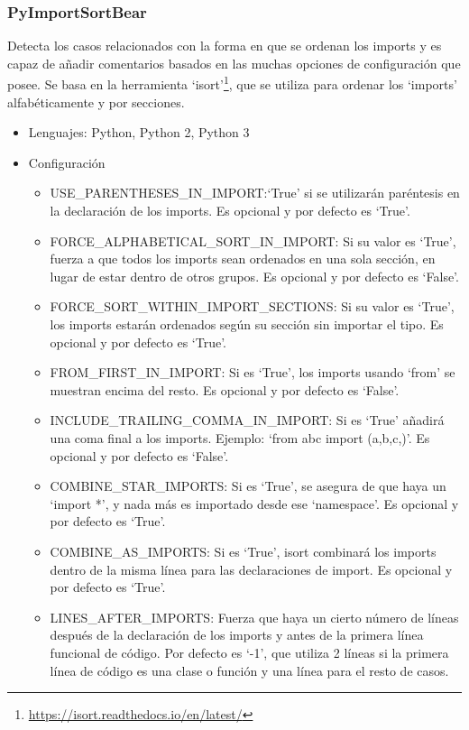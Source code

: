 \documentclass[a4paper, 12pt]{book}
\begin{document}
\subsubsection{PyImportSortBear}
\label{sec:seccion1.2.9}
Detecta los casos relacionados con la forma en que se ordenan los imports y es capaz de añadir comentarios basados en las muchas opciones de configuración que posee. Se basa en la herramienta `isort'\footnote{\url{https://isort.readthedocs.io/en/latest/}}, que se utiliza para ordenar los `imports' alfabéticamente y por secciones.

\begin{itemize}
  \item Lenguajes: Python, Python 2, Python 3
  \item Configuración
    \begin{itemize}
          \item USE\_PARENTHESES\_IN\_IMPORT:`True' si se utilizarán paréntesis en la declaración de los imports. Es opcional y por defecto es `True'.
          \item FORCE\_ALPHABETICAL\_SORT\_IN\_IMPORT: Si su valor es `True', fuerza a que todos los imports sean ordenados en una sola sección, en lugar de estar dentro de otros grupos. Es opcional y por defecto es `False'.
          \item FORCE\_SORT\_WITHIN\_IMPORT\_SECTIONS: Si su valor es `True', los imports estarán ordenados según su sección sin importar el tipo. Es opcional y por defecto es `True'.
          \item FROM\_FIRST\_IN\_IMPORT: Si es `True', los imports usando `from' se muestran encima del resto. Es opcional y por defecto es `False'.
          \item INCLUDE\_TRAILING\_COMMA\_IN\_IMPORT: Si es `True' añadirá una coma final a los imports. Ejemplo: `from abc import (a,b,c,)'. Es opcional y por defecto es `False'.
          \item COMBINE\_STAR\_IMPORTS: Si es `True', se asegura de que haya un `import *', y nada más es importado desde ese `namespace'. Es opcional y por defecto es `True'.
          \item COMBINE\_AS\_IMPORTS: Si es `True', isort combinará los imports dentro de la misma línea para las declaraciones de import. Es opcional y por defecto  es `True'.
          \item LINES\_AFTER\_IMPORTS: Fuerza que haya un cierto número de líneas después de la declaración de los imports y antes de la primera línea funcional de código. Por defecto es `-1', que utiliza 2 líneas si la primera línea de código es una clase o función y una línea para el resto de casos.

\end{itemize}
\end{itemize}
\end{document}
